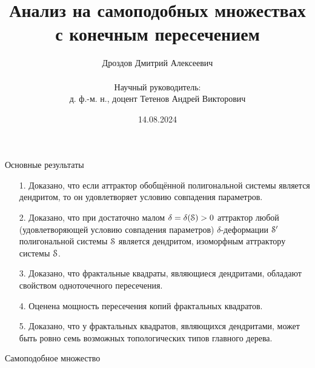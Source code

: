 \documentclass[aspectratio=1610, 10pt, notheorems]{beamer}
\title[Анализ на самоподобных множествах с конечным пересечением]
    {Анализ на самоподобных множествах с конечным пересечением}
\author[Дмитрий Дроздов]
    {Дроздов Дмитрий Алексеевич\\ \; \\
    Научный руководитель:\\ 
    д. ф.-м. н., доцент Тетенов Андрей Викторович}
\institute[ИМ СО РАН]{\large Институт математики имени С. Л. Соболева СО РАН}
\date[14.08.2024]{14.08.2024}
\newtheorem{definition}  {Определение}
\begin{document}
\Large


\begin{frame}{}
\titlepage
\end{frame}


\begin{frame}{Основные результаты}

{\large
\begin{itemize}
\item[1.] Доказано, что если аттрактор обобщённой полигональной системы является дендритом, то он удовлетворяет условию совпадения параметров.
\item[2.] Доказано, что при достаточно малом $\delta=\delta({\EuScript S})>0$ аттрактор любой (удовлетворяющей условию совпадения параметров) $\delta$-деформации ${\EuScript S}'$  полигональной системы ${\EuScript S}$ является дендритом, изоморфным аттрактору системы ${\EuScript S}$.
\item[3.] Доказано, что фрактальные квадраты, являющиеся дендритами, обладают свойством одноточечного пересечения.
\item[4.] Оценена мощность пересечения копий фрактальных квадратов.
\item[5.] Доказано, что у фрактальных квадратов, являющихся дендритами, может быть ровно семь возможных топологических типов главного дерева.
\end{itemize}}
\end{frame}


\begin{frame}{Самоподобное множество}

\end{frame}
\end{document}
